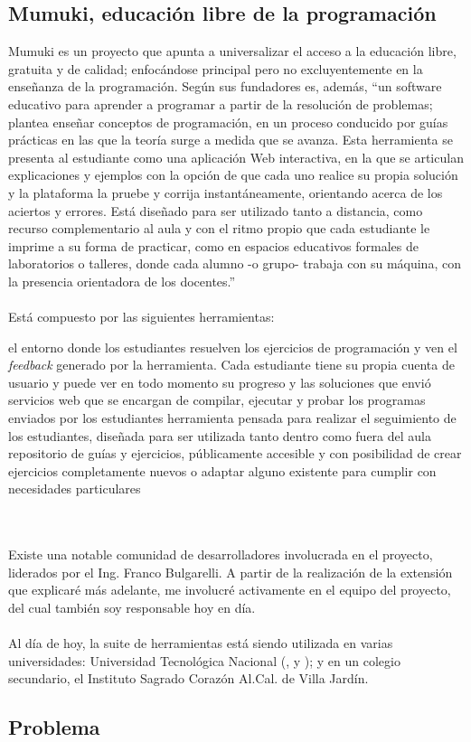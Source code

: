 \subsection{Mumuki, educación libre de la programación}
Mumuki es un proyecto que apunta a universalizar el acceso a la educación libre, gratuita y de calidad; enfocándose principal pero no excluyentemente en la enseñanza de la programación. Según sus fundadores es, además, ``un software educativo para aprender a programar a partir de la resolución de problemas; plantea enseñar conceptos de programación, en un proceso conducido por guías prácticas en las que la teoría surge a medida que se avanza. Esta herramienta se presenta al estudiante como una aplicación Web interactiva, en la que se articulan explicaciones y ejemplos con la opción de que cada uno realice su propia solución y la plataforma la pruebe y corrija instantáneamente, orientando acerca de los aciertos y errores. Está diseñado para ser utilizado tanto a distancia, como recurso complementario al aula y con el ritmo propio que cada estudiante le imprime a su forma de practicar, como en espacios educativos formales de laboratorios o talleres, donde cada alumno -o grupo- trabaja con su máquina, con la presencia orientadora de los docentes.''\cite{PaperMumuki}
\\\\
Está compuesto por las siguientes herramientas:
\begin{itemize}
   el entorno donde los estudiantes resuelven los ejercicios de programación y ven el \textit{feedback} generado por la herramienta. Cada estudiante tiene su propia cuenta de usuario y puede ver en todo momento su progreso y las soluciones que envió
   servicios web que se encargan de compilar, ejecutar y probar los programas enviados por los estudiantes
   herramienta pensada para realizar el seguimiento de los estudiantes, diseñada para ser utilizada tanto dentro como fuera del aula
   repositorio de guías y ejercicios, públicamente accesible y con posibilidad de crear ejercicios completamente nuevos o adaptar alguno existente para cumplir con necesidades particulares
\end{itemize}
\\\\
Existe una notable comunidad de desarrolladores involucrada en el proyecto, liderados por el Ing. Franco Bulgarelli. A partir de la realización de la extensión que explicaré más adelante, me involucré activamente en el equipo del proyecto, del cual también soy responsable hoy en día.
\\\\
Al día de hoy, la suite de herramientas está siendo utilizada en varias universidades: Universidad Tecnológica Nacional (,  y ); y en un colegio secundario, el Instituto Sagrado Corazón Al.Cal. de Villa Jardín.

\subsection{Problema}
